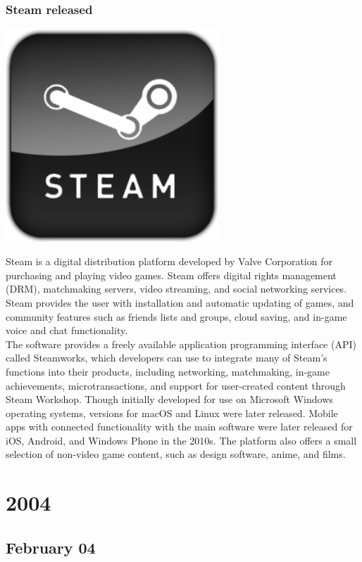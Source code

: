 \documentclass[11pt]{report}
\begin{document}
\subsection{Steam released}
\vspace{2mm}\begin{center}\includegraphics[width=8cm]{./img/1ststeamlogo.png}\end{center}
Steam is a digital distribution platform developed by Valve Corporation for purchasing and playing video games. Steam offers digital rights management (DRM), matchmaking servers, video streaming, and social networking services. Steam provides the user with installation and automatic updating of games, and community features such as friends lists and groups, cloud saving, and in-game voice and chat functionality.\\
The software provides a freely available application programming interface (API) called Steamworks, which developers can use to integrate many of Steam's functions into their products, including networking, matchmaking, in-game achievements, microtransactions, and support for user-created content through Steam Workshop. Though initially developed for use on Microsoft Windows operating systems, versions for macOS and Linux were later released. Mobile apps with connected functionality with the main software were later released for iOS, Android, and Windows Phone in the 2010s. The platform also offers a small selection of non-video game content, such as design software, anime, and films.

\chapter{2004}
\section{February 04}
\end{document}
